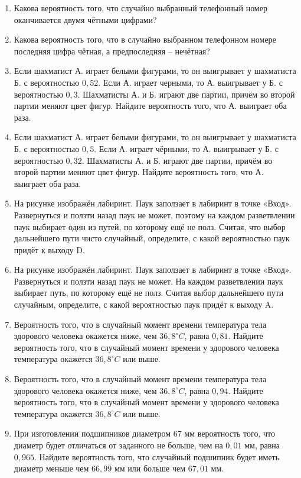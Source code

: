 \documentclass[12pt, a4paper]{article}
\begin{document}
	
	\begin{enumerate}
		\item Какова вероятность того, что случайно выбранный телефонный номер оканчивается двумя чётными цифрами?
		\item Какова вероятность того, что в случайно выбранном телефонном номере последняя цифра чётная, а предпоследняя – нечётная?
		\item Если шахматист А. играет белыми фигурами, то он выигрывает у шахматиста Б. с вероятностью \( 0,52 \). Если А. играет черными, то А. выигрывает у Б. с вероятностью \( 0,3 \). Шахматисты А. и Б. играют две партии, причём во второй партии меняют цвет фигур. Найдите вероятность того, что А. выиграет оба раза.
		\item Если шахматист А. играет белыми фигурами, то он выигрывает у шахматиста Б. с вероятностью \( 0,5 \). Если А. играет чёрными, то А. выигрывает у Б. с вероятностью \( 0,32 \). Шахматисты А. и Б. играют две партии, причём во второй партии меняют цвет фигур. Найдите вероятность того, что А. выиграет оба раза.
		\item На рисунке изображён лабиринт. Паук заползает в лабиринт в точке «Вход». Развернуться и ползти назад паук не может, поэтому на каждом разветвлении паук выбирает один из путей, по которому ещё не полз. Считая, что выбор дальнейшего пути чисто случайный, определите, с какой вероятностью паук придёт к выходу D.
		\item На рисунке изображён лабиринт. Паук заползает в лабиринт в точке «Вход». Развернуться и ползти назад паук не может. На каждом разветвлении паук выбирает путь, по которому ещё не полз. Считая выбор дальнейшего пути случайным, определите, с какой вероятностью паук придёт к выходу A.
		\item Вероятность того, что в случайный момент времени температура тела здорового человека окажется ниже, чем \( 36,8^{\circ}C \), равна \( 0,81 \). Найдите вероятность того, что в случайный момент времени у здорового человека температура окажется \( 36,8^{\circ}C \) или выше.
		\item Вероятность того, что в случайный момент времени температура тела здорового человека окажется ниже, чем \( 36,8^{\circ}C \), равна \( 0,94 \). Найдите вероятность того, что в случайный момент времени у здорового человека температура окажется \( 36,8^{\circ}C \) или выше.
		\item При изготовлении подшипников диаметром \( 67 \) мм вероятность того, что диаметр будет отличаться от заданного не больше, чем на \( 0,01 \) мм, равна \( 0,965 \). Найдите вероятность того, что случайный подшипник будет иметь диаметр меньше чем \( 66,99 \) мм или больше чем \( 67,01 \) мм.

\end{enumerate}
\end{document}
